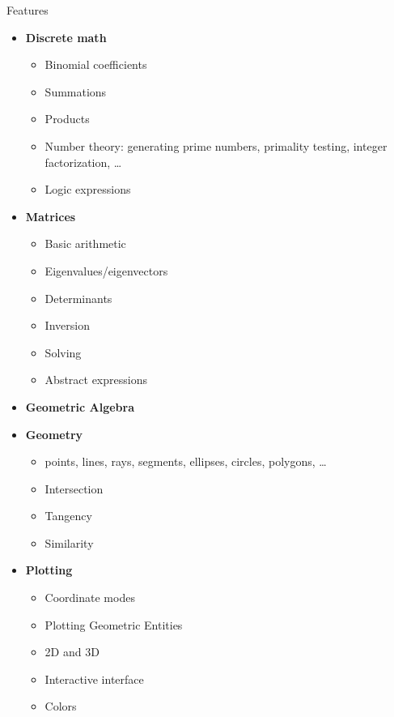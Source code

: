 \documentclass[xcolor=svgnames]{beamer}
\begin{document}
\begin{frame}{Features}
  \begin{multicols}{2}
    \begin{itemize}
      \tiny
    \item \textbf{Discrete math}
      \begin{itemize}
        \tiny
      \item Binomial coefficients
      \item Summations
      \item Products
      \item Number theory: generating prime numbers, primality testing, integer
        factorization, \ldots
      \item Logic expressions
      \end{itemize}

    \item \textbf{Matrices}
      \begin{itemize}
        \tiny
      \item Basic arithmetic
      \item Eigenvalues/eigenvectors
      \item Determinants
      \item Inversion
      \item Solving
      \item Abstract expressions
      \end{itemize}


    \item \textbf{Geometric Algebra}


    \item \textbf{Geometry}
      \begin{itemize}
        \tiny
      \item points, lines, rays, segments, ellipses, circles, polygons, \ldots
      \item Intersection
      \item Tangency
      \item Similarity
      \end{itemize}

    \item \textbf{Plotting}
      \begin{itemize}
        \tiny
      \item Coordinate modes
      \item Plotting Geometric Entities
      \item 2D and 3D
      \item Interactive interface
      \item Colors
      \end{itemize}


\end{itemize}
\end{multicols}
\end{frame}
\end{document}
